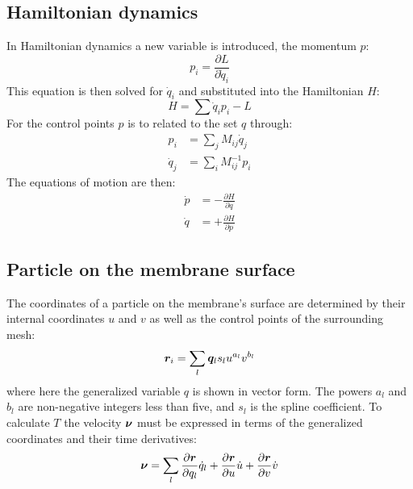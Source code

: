 \subsection{Hamiltonian dynamics}

In Hamiltonian dynamics a new variable is introduced, the momentum $p$:
\begin{equation}
p_i = \frac{\partial L}{\partial \dot{q}_i}
\end{equation}
This equation is then solved for $\dot{q}_i$ and substituted into the Hamiltonian $H$:
\begin{equation}
H = \sum \dot{q}_i p_i - L
\label{eq:legendre}
\end{equation}
For the control points $p$ is to related to the set $q$ through:
\begin{align}
\label{eq:pqdot}
p_i &= \sum_j{ M_{ij} \dot{q}_j } \\
\label{eq:qdotp}
\dot{q}_j &= \sum_i{ M^{-1}_{ij} p_i}
\end{align}
The equations of motion are then:
\begin{align}
\dot{p} &= - \frac{\partial H }{\partial q} \\
\dot{q} &= + \frac{\partial H }{\partial p}
\end{align} 

\subsection{Particle on the membrane surface}

The coordinates of a particle on the membrane's surface are determined by their internal coordinates $u$ and $v$ as well as the control points of the surrounding mesh:
\begin{equation}
\boldsymbol{r}_i = \sum_{l} \boldsymbol{q}_l s_l u^{a_l} v^{b_l}
\end{equation}
where here the generalized variable $q$ is shown in vector form.
The powers $a_l$ and $b_l$ are non-negative integers less than five, and $s_l$ is the spline coefficient.
To calculate $T$ the velocity $\boldsymbol{\nu}$ must be expressed in terms of the generalized coordinates and their time derivatives:
\begin{equation}
\boldsymbol{\nu} =  \sum_l \frac{\partial \boldsymbol{r}}{\partial q_l} \dot{q}_l + \frac{\partial \boldsymbol{r}}{\partial u} \dot{u} +
\frac{\partial \boldsymbol{r}}{\partial v}\dot{v}
\end{equation} 

